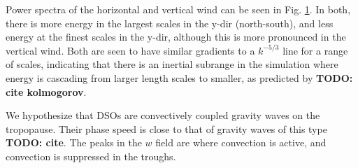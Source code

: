 \documentclass[11pt,a4paper]{article}
\newcommand\todo[1]{\textbf{TODO: #1}}
\begin{document}
Power spectra of the horizontal and vertical wind can be seen in Fig. \ref{fig:power_spectra}. In both, there is more energy in the largest scales in the y-dir (north-south), and less energy at the finest scales in the y-dir, although this is more pronounced in the vertical wind. Both are seen to have similar gradients to a $k^{-5/3}$ line for a range of scales, indicating that there is an inertial subrange in the simulation where energy is cascading from larger length scales to smaller, as predicted by \todo{cite kolmogorov}.

\begin{figure}[htp!]%
    \centering
    \qquad
    \caption{}%
    \label{fig:power_spectra}%
\end{figure}


We hypothesize that DSOs are convectively coupled gravity waves on the tropopause. Their phase speed is close to that of gravity waves of this type \todo{cite}. The peaks in the $w$ field are where convection is active, and convection is suppressed in the troughs. 
\end{document}

